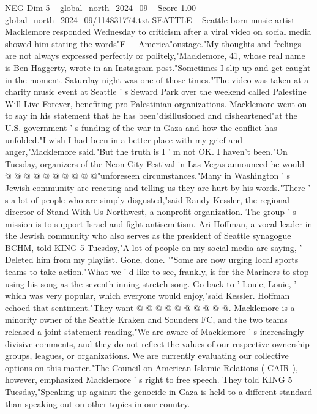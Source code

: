 \begin{textsample}{NEG Dim 5 – global\_north\_2024\_09 – Score 1.00 – global\_north\_2024\_09/114831774.txt}  \label{ex:f5_neg_095}
SEATTLE -- Seattle-born music artist Macklemore responded Wednesday to criticism after a viral video on social media showed him stating the words"F- -- America"onstage."My thoughts and feelings are not always expressed perfectly or politely,"Macklemore, 41, whose real name is Ben Haggerty, wrote in an Instagram post."Sometimes I slip up and get caught in the moment.
Saturday night was one of those times."The video was taken at a charity music event at Seattle ' s Seward Park over the weekend called Palestine Will Live Forever, benefiting pro-Palestinian organizations.
Macklemore went on to say in his statement that he has been"disillusioned and disheartened"at the U.S. government ' s funding of the war in Gaza and how the conflict has unfolded."I wish I had been in a better place with my grief and anger,"Macklemore said."But the truth is I ' m not OK.
I haven't been."On Tuesday, organizers of the Neon City Festival in Las Vegas announced he would @ @ @ @ @ @ @ @ @ @"unforeseen circumstances."Many in Washington ' s Jewish community are reacting and telling us they are hurt by his words."There ' s a lot of people who are simply disgusted,"said Randy Kessler, the regional director of Stand With Us Northwest, a nonprofit organization.
The group ' s mission is to support Israel and fight antisemitism.
Ari Hoffman, a vocal leader in the Jewish community who also serves as the president of Seattle synagogue BCHM, told KING 5 Tuesday,"A lot of people on my social media are saying, ' Deleted him from my playlist.
Gone, done. '"Some are now urging local sports teams to take action."What we ' d like to see, frankly, is for the Mariners to stop using his song as the seventh-inning stretch song.
Go back to ' Louie, Louie, ' which was very popular, which everyone would enjoy,"said Kessler.
Hoffman echoed that sentiment."They want @ @ @ @ @ @ @ @ @ @.
Macklemore is a minority owner of the Seattle Kraken and Sounders FC, and the two teams released a joint statement reading,"We are aware of Macklemore ' s increasingly divisive comments, and they do not reflect the values of our respective ownership groups, leagues, or organizations.
We are currently evaluating our collective options on this matter."The Council on American-Islamic Relations ( CAIR ), however, emphasized Macklemore ' s right to free speech.
They told KING 5 Tuesday,"Speaking up against the genocide in Gaza is held to a different standard than speaking out on other topics in our country.

\end{textsample}
